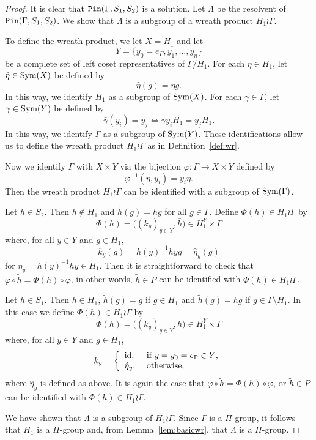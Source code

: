 \documentclass[10pt,a4paper]{amsart}
\theoremstyle{definition}
\theoremstyle{definition}
\numberwithin{equation}{section}
\begin{document}
\begin{proof} It is clear that $\mbox{\tt Pin} (\Gamma, S_1, S_2)$ is a solution. Let $\Lambda$ be the resolvent of $\mbox{\tt Pin} (\Gamma, S_1, S_2)$. We show that $\Lambda$ is a subgroup of a wreath product $H_1\wr \Gamma$. 

To define the wreath product, we let $X=H_1$ and let $$Y=\{y_0=e_\Gamma, y_1, \dots, y_n\}$$ be a complete set of left coset representatives of $\Gamma/H_1$. For each $\eta\in H_1$, let $\hat{\eta}\in \mbox{\rm Sym}(X)$ be defined by 
$$ \hat{\eta}(g)=\eta g. $$
In this way, we identify $H_1$ as a subgroup of $\mbox{\rm Sym}(X)$.  For each $\gamma\in \Gamma$, let $\bar{\gamma}\in \mbox{\rm Sym}(Y)$ be defined by
$$ \bar{\gamma}(y_i)=y_j \iff \gamma y_iH_1=y_j H_1. $$
In this way, we identify $\Gamma$ as a subgroup of $\mbox{\rm Sym}(Y)$. These identifications allow us to define the wreath product $H_1\wr \Gamma$ as in Definition~\ref{def:wr}.

Now we identify $\Gamma$ with $X\times Y$ via the bijection $\varphi\colon \Gamma\to X\times Y$ defined by
$$ \varphi^{-1}(\eta, y_i)=y_i\eta. $$
Then the wreath product $H_1\wr \Gamma$ can be identified with a subgroup of $\mbox{\rm Sym}(\Gamma)$. 

Let $h\in S_2$. Then $h\not\in H_1$ and $\tilde{h}(g)=hg$ for all $g\in \Gamma$. Define $\Phi(h)\in H_1\wr \Gamma$ by 
$$ \Phi(h)=\big((k_y)_{y\in Y}, \bar{h}\big)\in H_1^Y\times \Gamma $$
where, for all $y\in Y$ and $g\in H_1$,
$$ k_y(g)=\bar{h}(y)^{-1}hyg=\hat{\eta}_y(g)  $$
for $\eta_y=\bar{h}(y)^{-1}hy\in H_1$. 
Then it is straightforward to check that $\varphi\circ \tilde{h}=\Phi(h)\circ \varphi$, in other words, $\tilde{h}\in P$ can be identified with $\Phi(h)\in H_1\wr \Gamma$.

Let $h\in S_1$. Then $h\in H_1$, $\tilde{h}(g)=g$ if $g\in H_1$ and $\tilde{h}(g)=hg$ if $g\in \Gamma\setminus H_1$. In this case we define $\Phi(h)\in H_1\wr \Gamma$ by
$$ \Phi(h)=\big((k_y)_{y\in Y}, \bar{h}\big)\in H_1^Y\times \Gamma $$
where, for all $y\in Y$ and $g\in H_1$, 
$$ k_y=\left\{\begin{array}{ll} \mbox{\rm id}, & \mbox{ if $y=y_0=e_\Gamma\in Y$,} \\ \hat{\eta}_y, & \mbox{ otherwise}, \end{array}\right. $$
where $\hat{\eta}_y$ is defined as above. It is again the case that $\varphi\circ \tilde{h}=\Phi(h)\circ \varphi$, or $\tilde{h}\in P$ can be identified with $\Phi(h)\in H_1\wr\Gamma$.  

We have shown that $\Lambda$ is a subgroup of $H_1\wr \Gamma$. Since $\Gamma$ is a $\Pi$-group, it follows that $H_1$ is a $\Pi$-group and, from Lemma~\ref{lem:basicwr}, that $\Lambda$ is a $\Pi$-group. 
\end{proof}
\end{document}

